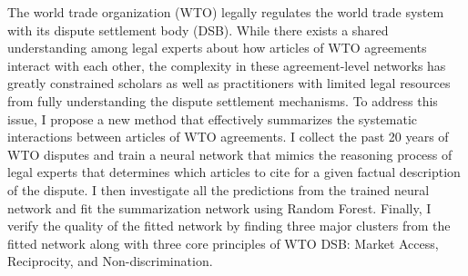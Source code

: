 The world trade organization (WTO) legally regulates the world trade system with its dispute settlement body (DSB). While there exists a shared understanding among legal experts about how articles of WTO agreements interact with each other, the complexity in these agreement-level networks has greatly constrained scholars as well as practitioners with limited legal resources from fully understanding the dispute settlement mechanisms.  To address this issue, I propose a new method that effectively summarizes the systematic interactions between articles of WTO agreements. I collect the past 20 years of WTO disputes and train a neural network that mimics the reasoning process of legal experts that determines which articles to cite for a given factual description of the dispute.
I then investigate all the predictions from the trained neural network and fit the summarization network using Random Forest.
Finally, I verify the quality of the fitted network by finding three major clusters from the fitted network along with three core principles of WTO DSB: Market Access, Reciprocity, and Non-discrimination.
